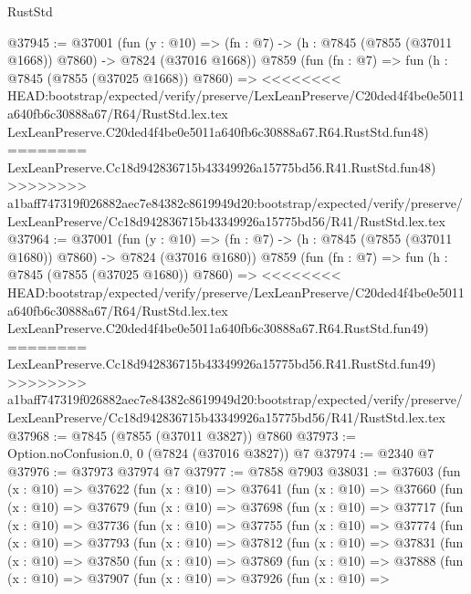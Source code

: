 \begin{lexlean}{RustStd}
\begin{coremodule}
{\begin{coremodule}
{{{{{{{{{{{{{{{{{{{{{{{{{{{{{{{{{{{{{{{{{{{{{{{{{{{{{{@37945 := @37001
    (fun (y : @10) => (fn : @7) -> (h : @7845 (@7855 (@37011 @1668)) @7860) -> @7824 (@37016 @1668))
    @7859
    (fun (fn : @7) =>
    fun (h : @7845 (@7855 (@37025 @1668)) @7860) =>
<<<<<<<< HEAD:bootstrap/expected/verify/preserve/LexLeanPreserve/C20ded4f4be0e5011a640fb6c30888a67/R64/RustStd.lex.tex
    LexLeanPreserve.C20ded4f4be0e5011a640fb6c30888a67.R64.RustStd.fun48)
========
    LexLeanPreserve.Cc18d942836715b43349926a15775bd56.R41.RustStd.fun48)
>>>>>>>> a1baff747319f026882aec7e84382c8619949d20:bootstrap/expected/verify/preserve/LexLeanPreserve/Cc18d942836715b43349926a15775bd56/R41/RustStd.lex.tex
@37964 := @37001
    (fun (y : @10) => (fn : @7) -> (h : @7845 (@7855 (@37011 @1680)) @7860) -> @7824 (@37016 @1680))
    @7859
    (fun (fn : @7) =>
    fun (h : @7845 (@7855 (@37025 @1680)) @7860) =>
<<<<<<<< HEAD:bootstrap/expected/verify/preserve/LexLeanPreserve/C20ded4f4be0e5011a640fb6c30888a67/R64/RustStd.lex.tex
    LexLeanPreserve.C20ded4f4be0e5011a640fb6c30888a67.R64.RustStd.fun49)
========
    LexLeanPreserve.Cc18d942836715b43349926a15775bd56.R41.RustStd.fun49)
>>>>>>>> a1baff747319f026882aec7e84382c8619949d20:bootstrap/expected/verify/preserve/LexLeanPreserve/Cc18d942836715b43349926a15775bd56/R41/RustStd.lex.tex
@37968 := @7845 (@7855 (@37011 @3827)) @7860
@37973 := Option.noConfusion.{0, 0} (@7824 (@37016 @3827)) @7
@37974 := @2340 @7
@37976 := @37973 @37974 @7
@37977 := @7858 @7903
@38031 := @37603
    (fun (x : @10) =>
    @37622
      (fun (x : @10) =>
      @37641
        (fun (x : @10) =>
        @37660
          (fun (x : @10) =>
          @37679
            (fun (x : @10) =>
            @37698
              (fun (x : @10) =>
              @37717
                (fun (x : @10) =>
                @37736
                  (fun (x : @10) =>
                  @37755
                    (fun (x : @10) =>
                    @37774
                      (fun (x : @10) =>
                      @37793
                        (fun (x : @10) =>
                        @37812
                          (fun (x : @10) =>
                          @37831
                            (fun (x : @10) =>
                            @37850
                              (fun (x : @10) =>
                              @37869
                                (fun (x : @10) =>
                                @37888
                                  (fun (x : @10) =>
                                  @37907
                                    (fun (x : @10) =>
                                    @37926
                                      (fun (x : @10) =>
}}}}}}}}}}}}}}}}}}}}}}}}}}}}}}}}}}}}}}}}}}}}}}}}}}}}}}
\end{coremodule}}
\end{coremodule}
\end{lexlean}

